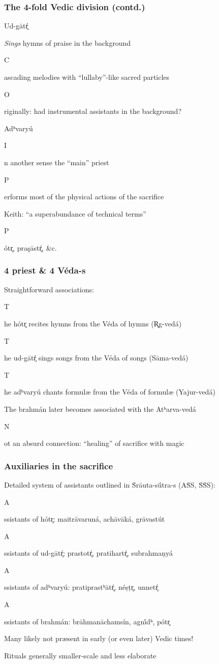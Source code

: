 \documentclass[pdf]{beamer}
\newcommand{\Subitem}[1]{{\setlength\itemindent{12pt} \item[-] #1}}
\begin{document}
\begin{frame} \frametitle{The 4-fold Vedic division (contd.)}
\begin{itemize}
	\item Ud-gātŕ̥
	\Subitem {\emph{Sings} hymns of praise in the background}
	\Subitem Cascading melodies with ``lullaby''-like sacred particles
	\Subitem Originally: had instrumental assistants in the background?
	\item Adʰvaryú 
	\Subitem In another sense the ``main'' priest
	\Subitem Performs most of the physical actions of the sacrifice
	\item Keith: ``a superabundance of technical terms''
	\Subitem Pótr̥, praşāstŕ̥, \&c.
\end{itemize}
\end{frame}

\begin{frame} \frametitle{4 priest \& 4 Véda-s}
\begin{itemize}
	\item Straightforward associations:
	\Subitem The hótr̥ recites hymns from the Véda of hymns (R̥g-vedá)
	\Subitem The ud-gātŕ̥ sings songs from the Véda of songs (Sāma-vedá)
	\Subitem The adʰvaryú chants formulæ from the Véda of formulæ (Yajur-vedá)
	\item The brahmán later becomes associated with the Atʰarva-vedá
	\Subitem Not an absurd connection: ``healing'' of sacrifice with magic
\end{itemize}
\end{frame}

\begin{frame} \frametitle{Auxiliaries in the sacrifice}
\begin{itemize}
	\item Detailed system of assistants outlined in Ṡrāuta-sū́tra-s (AṠS, ṠṠS):
	\Subitem Assistants of hótr̥: maitrāvaruná, achāvāká, grāvastút
	\Subitem Assistants of ud-gātŕ̥: prastotŕ̥, pratihartŕ̥, subrahmaṇyá
	\Subitem Assistants of adʰvaryú: pratiprastʰātŕ̥, néṣṭr̥, unnetŕ̥
	\Subitem Assistants of brahmán: brāhmanāchamsín, agnī́dʰ, pótr̥
	\item Many likely not præsent in early (or even later) Vedic times!
	\item Rituals generally smaller-scale and less elaborate
\end{itemize}
\end{frame}
\end{document}
